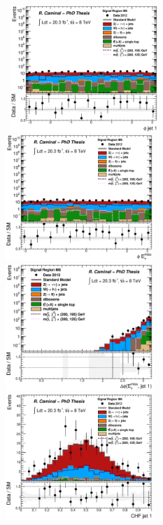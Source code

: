 \begin{figure}[!ht]
  \begin{center}
    \mbox{
      \includegraphics[width=0.495\textwidth]{MonojetAnalysis/Figures/plot_Stop_A10_SR_phi1_fitted.eps}
      \includegraphics[width=0.495\textwidth]{MonojetAnalysis/Figures/plot_Stop_A10_SR_met_phi_fitted.eps}
    }
    \mbox{
      \includegraphics[width=0.495\textwidth]{MonojetAnalysis/Figures/plot_Stop_A10_SR_dPhi_met_j1_fitted.eps}
      \includegraphics[width=0.495\textwidth]{MonojetAnalysis/Figures/plot_Stop_A10_SR_j1_chf_fitted.eps}
}
\end{center}
\end{figure}
